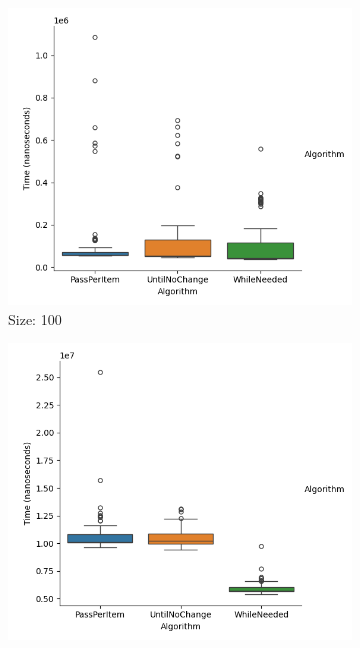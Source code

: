 \documentclass{article}
\begin{document}
\begin{figure}[ht]
  \centering
  \begin{subfigure}{0.3\textwidth}
    \centering
    \includegraphics[width=\linewidth]{../figureByteRandom100.png}
    \caption{Size: 100}
    \label{fig:img1}
  \end{subfigure}
  \begin{subfigure}{0.3\textwidth}
    \centering
    \includegraphics[width=\linewidth]{../figureByteRandom1000.png}

\end{subfigure}
\end{figure}
\end{document}
